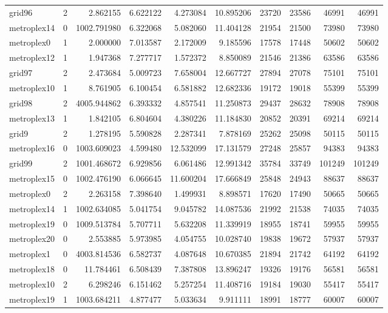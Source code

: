 \begin{longtable}{|l|r|r|r|r|r|r|r|r|r|}
grid96 & 2 & 2.862155 & 6.622122 & 4.273084 & 10.895206 & 23720 & 23586 & 46991 & 46991 \\
metroplex14 & 0 & 1002.791980 & 6.322068 & 5.082060 & 11.404128 & 21954 & 21500 & 73980 & 73980 \\
metroplex0 & 1 & 2.000000 & 7.013587 & 2.172009 & 9.185596 & 17578 & 17448 & 50602 & 50602 \\
metroplex12 & 1 & 1.947368 & 7.277717 & 1.572372 & 8.850089 & 21546 & 21386 & 63586 & 63586 \\
grid97 & 2 & 2.473684 & 5.009723 & 7.658004 & 12.667727 & 27894 & 27078 & 75101 & 75101 \\
metroplex10 & 1 & 8.761905 & 6.100454 & 6.581882 & 12.682336 & 19172 & 19018 & 55399 & 55399 \\
grid98 & 2 & 4005.944862 & 6.393332 & 4.857541 & 11.250873 & 29437 & 28632 & 78908 & 78908 \\
metroplex13 & 1 & 1.842105 & 6.804604 & 4.380226 & 11.184830 & 20852 & 20391 & 69214 & 69214 \\
grid9 & 2 & 1.278195 & 5.590828 & 2.287341 & 7.878169 & 25262 & 25098 & 50115 & 50115 \\
metroplex16 & 0 & 1003.609023 & 4.599480 & 12.532099 & 17.131579 & 27248 & 25857 & 94383 & 94383 \\
grid99 & 2 & 1001.468672 & 6.929856 & 6.061486 & 12.991342 & 35784 & 33749 & 101249 & 101249 \\
metroplex15 & 0 & 1002.476190 & 6.066645 & 11.600204 & 17.666849 & 25848 & 24943 & 88637 & 88637 \\
metroplex0 & 2 & 2.263158 & 7.398640 & 1.499931 & 8.898571 & 17620 & 17490 & 50665 & 50665 \\
metroplex14 & 1 & 1002.634085 & 5.041754 & 9.045782 & 14.087536 & 21992 & 21538 & 74035 & 74035 \\
metroplex19 & 0 & 1009.513784 & 5.707711 & 5.632208 & 11.339919 & 18955 & 18741 & 59955 & 59955 \\
metroplex20 & 0 & 2.553885 & 5.973985 & 4.054755 & 10.028740 & 19838 & 19672 & 57937 & 57937 \\
metroplex1 & 0 & 4003.814536 & 6.582737 & 4.087648 & 10.670385 & 21894 & 21742 & 64192 & 64192 \\
metroplex18 & 0 & 11.784461 & 6.508439 & 7.387808 & 13.896247 & 19326 & 19176 & 56581 & 56581 \\
metroplex10 & 2 & 6.298246 & 6.151462 & 5.257254 & 11.408716 & 19184 & 19030 & 55417 & 55417 \\
metroplex19 & 1 & 1003.684211 & 4.877477 & 5.033634 & 9.911111 & 18991 & 18777 & 60007 & 60007 \\

\end{longtable}
